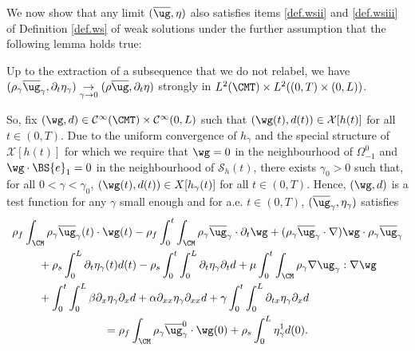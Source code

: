 We now show that any limit $(\overline{\ug},\eta)$ also satisfies items \eqref{def.wsii} and \eqref{def.wsiii} of Definition \ref{def.ws} of weak solutions under the further assumption that the following lemma holds true:

\begin{lemma}\label{lemma.convergence.L2} Up to the extraction of a subsequence that we do not relabel, we have $(\rho_\gamma\overline{\ug}_{\gamma},\partial_{t}\eta_{\gamma})\underset{\gamma\to 0}{\to}(\rho\overline{\ug},\partial_{t}\eta)$ strongly in $L^{2}(\CMT)\times L^{2}((0, T)\times (0,L))$.
\end{lemma}

So, fix $(\wg, d)\in\mathcal{C}^{\infty}(\CMT)\times \mathcal{C}^{\infty}(0, L) $ such that $(\wg(t), d(t))\in\mathcal{X}[h(t)]$ for all $t\in(0,T)$.
Due to the uniform convergence of $h_\gamma$ and the special structure of $\mathcal{X}[h(t)]$ for which we require that $\wg=0$ in the neighbourhood of $\Omega^0_{-1}$ and $\wg\cdot\BS{e}_{1}=0$ in the neighbourhood of $\mathcal{S}_h(t)$, there exists $\gamma_{0}>0$ such that, for all $0<\gamma<\gamma_{0}$, $(\wg(t),d(t))\in X[h_{\gamma}(t)]$ for all $t\in(0,T)$. Hence, $(\wg,d)$ is a test function for any $\gamma$ small enough and for a.e. $t\in(0,T)$, $(\overline{\ug}_{\gamma},\eta_{\gamma})$ satisfies
\begin{multline}\label{weak.formulation.FS.gamma.limit}
\rho_{f}\int_{\CM}\rho_{\gamma}\overline{\ug}_{\gamma}(t)\cdot\wg(t) -\rho_{f}\int_{0}^{t}\int_{\CM}\rho_{\gamma}\overline{\ug}_{\gamma}\cdot\partial_{t}\wg + (\rho_{\gamma}\overline{\ug}_{\gamma}\cdot\nabla)\wg\cdot\rho_{\gamma}\overline{\ug}_{\gamma}\\
\begin{aligned}
&+\rho_{s}\int_{0}^{L}\partial_{t}\eta_{\gamma}(t)d(t)-\rho_{s}\int_{0}^{t}\int_{0}^{L}\partial_{t}\eta_{\gamma}\partial_{t}d+\mu\int_{0}^{t}\int_{\CM}\rho_{\gamma} \nabla\ug_{\gamma}:\nabla\wg\\
&+\int_{0}^{t}\int_{0}^{L}\beta\partial_{x}\eta_{\gamma}\partial_{x}d + \alpha\partial_{xx}\eta_{\gamma}\partial_{xx}d+\gamma\int_{0}^{t}\int_{0}^{L}\partial_{tx}\eta_{\gamma}\partial_{x}d
\end{aligned}
\\
=\rho_{f}\int_{\CM}\rho_{\gamma}\overline{\ug}^{0}_{\gamma}\cdot\wg(0)+\rho_{s}\int_{0}^{L}\eta^{1}_{\gamma}d(0).
\end{multline}

